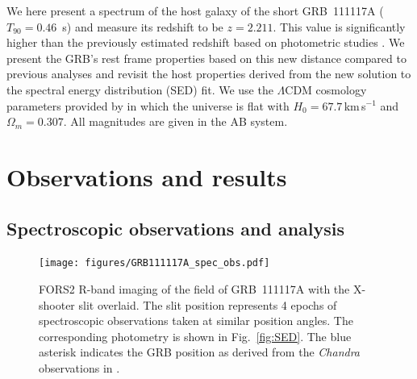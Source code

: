 \documentclass{aa}    %
\begin{document}
We here present a spectrum of the host galaxy of the short
GRB~111117A ($T_{90}=0.46$~s) and measure its redshift to be $z=2.211$. This
value is significantly higher than the previously estimated redshift based on
photometric studies \citep{Margutti2012,Sakamoto2013}. We present the GRB's rest
frame properties based on this new distance compared to previous analyses and
revisit the host properties derived from the new solution to the spectral energy distribution (SED) fit.
We use the $\Lambda$CDM cosmology parameters provided by
\citet{Planck2015} in which the universe is flat with $H_0 = 67.7$\,km\,s$^{-1}$
and $\Omega_m = 0.307$. All magnitudes are given in the AB system.


\section{Observations and results}

\subsection{Spectroscopic observations and analysis}

\begin{figure}
	\centering
	\texttt{[image: figures/GRB111117A\_spec\_obs.pdf]}
	\caption{
	FORS2 R-band imaging of the field of GRB~111117A with the X-shooter slit overlaid. The slit
	position represents 4 epochs of spectroscopic observations taken at similar
	position angles. The corresponding photometry
	is shown in Fig.~\ref{fig:SED}. The blue asterisk indicates the GRB position as
	derived from the \emph{Chandra} observations in \citet{Sakamoto2013}. 
	}
	\label{fig:spec_setup}
\end{figure}
\end{document}
